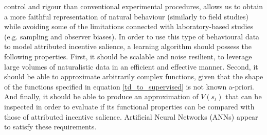 control and rigour than conventional experimental procedures, allows us to obtain a more faithful representation of natural behaviour (similarly to field studies) while avoiding some of the limitations connected with laboratory-based studies (e.g. sampling and observer biases).
\newline
\newline
In order to use this type of behavioural data to model attributed incentive salience, a learning algorithm should possess the following properties. First, it should be scalable and noise resilient, to leverage large volumes of naturalistic data in an efficient and effective manner. Second, it should be able to approximate arbitrarily complex functions, given that the shape of the functions specified in equation \ref{td_to_supervised} is not known a-priori. And finally, it should be able to produce an approximation of $V(s_{t})$ that can be inspected in order to evaluate if its functional properties can be compared with those of attributed incentive salience. Artificial Neural Networks (ANNs) appear to satisfy these requirements.

